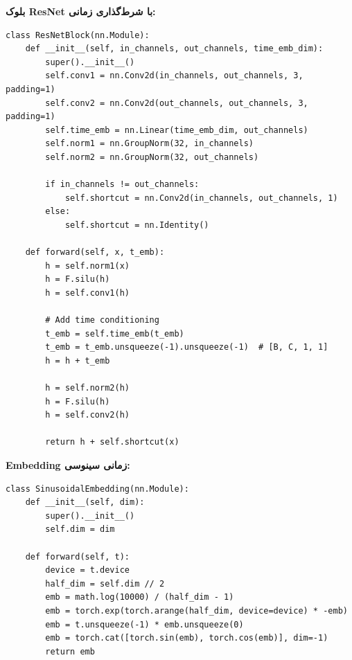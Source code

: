 \textbf{بلوک ResNet با شرط‌گذاری زمانی:}
\begin{verbatim}
class ResNetBlock(nn.Module):
    def __init__(self, in_channels, out_channels, time_emb_dim):
        super().__init__()
        self.conv1 = nn.Conv2d(in_channels, out_channels, 3, padding=1)
        self.conv2 = nn.Conv2d(out_channels, out_channels, 3, padding=1)
        self.time_emb = nn.Linear(time_emb_dim, out_channels)
        self.norm1 = nn.GroupNorm(32, in_channels)
        self.norm2 = nn.GroupNorm(32, out_channels)
        
        if in_channels != out_channels:
            self.shortcut = nn.Conv2d(in_channels, out_channels, 1)
        else:
            self.shortcut = nn.Identity()
    
    def forward(self, x, t_emb):
        h = self.norm1(x)
        h = F.silu(h)
        h = self.conv1(h)
        
        # Add time conditioning
        t_emb = self.time_emb(t_emb)
        t_emb = t_emb.unsqueeze(-1).unsqueeze(-1)  # [B, C, 1, 1]
        h = h + t_emb
        
        h = self.norm2(h)
        h = F.silu(h)
        h = self.conv2(h)
        
        return h + self.shortcut(x)
\end{verbatim}

\textbf{Embedding زمانی سینوسی:}
\begin{verbatim}
class SinusoidalEmbedding(nn.Module):
    def __init__(self, dim):
        super().__init__()
        self.dim = dim
    
    def forward(self, t):
        device = t.device
        half_dim = self.dim // 2
        emb = math.log(10000) / (half_dim - 1)
        emb = torch.exp(torch.arange(half_dim, device=device) * -emb)
        emb = t.unsqueeze(-1) * emb.unsqueeze(0)
        emb = torch.cat([torch.sin(emb), torch.cos(emb)], dim=-1)
        return emb
\end{verbatim}

